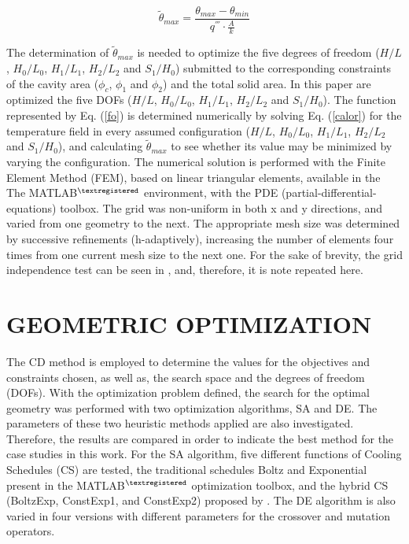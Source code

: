 \documentclass[12pt,fleqn]{article}
\begin{document}
\begin{equation}
\tilde{\theta}_{max}=\frac{\theta_{max}-\theta_{min}}{q^{'''}\cdot\frac{A}{k}}\label{fo}
\end{equation}

The determination of $\tilde{\theta}_{max}$ is needed to optimize the five degrees of freedom ($H/L$, $H_{0}/L_{0}$, $H_{1}/L_{1}$, $H_{2}/L_{2}$ and $S_{1}/H_{0}$) submitted to the corresponding constraints of the cavity area ($\phi_{c}$, $\phi_{1}$ and $\phi_{2}$) and the total solid area. In this paper are optimized the five DOFs ($H/L$, $H_{0}/L_{0}$, $H_{1}/L_{1}$, $H_{2}/L_{2}$ and $S_{1}/H_{0}$). The function represented by Eq. (\ref{fo}) is determined numerically by solving Eq. (\ref{calor}) for the temperature field in every assumed configuration ($H/L$, $H_{0}/L_{0}$, $H_{1}/L_{1}$, $H_{2}/L_{2}$ and $S_{1}/H_{0}$), and calculating $\tilde{\theta}_{max}$ to see whether its value may be minimized by varying the configuration. The numerical solution is performed with the Finite Element Method (FEM)\citep{Reddy1994}, based on linear triangular elements, available in the The MATLAB$^{\tiny ®}$ environment, with the PDE (partial-differential-equations) toolbox. The grid was non-uniform in both x and y directions, and varied from one geometry to the next. The appropriate mesh size was determined by successive refinements (h-adaptively), increasing the number of elements four times from one current mesh size to the next one. For the sake of brevity, the grid independence test can be seen in \cite{Gonzales2015b}, and, therefore, it is note repeated here.

\section{GEOMETRIC OPTIMIZATION}

The CD method is employed to determine the values for the  objectives and constraints chosen, as well as, the search space and the degrees of freedom (DOFs). With the optimization problem defined, the search for the optimal geometry was performed with two optimization algorithms, SA and DE. The parameters of these two heuristic methods applied are also investigated. Therefore, the results are compared in order to indicate the best method for the case studies in this work. For the SA algorithm, five different functions of Cooling Schedules (CS) are tested, the traditional schedules Boltz and Exponential present in the MATLAB$^{\tiny ®}$ optimization toolbox, and the hybrid CS (BoltzExp, ConstExp1, and ConstExp2) proposed by \cite{Gonzales2015b, Gonzales2015}. The DE algorithm is also  varied in four versions with different parameters for the crossover and mutation operators.
\end{document}
